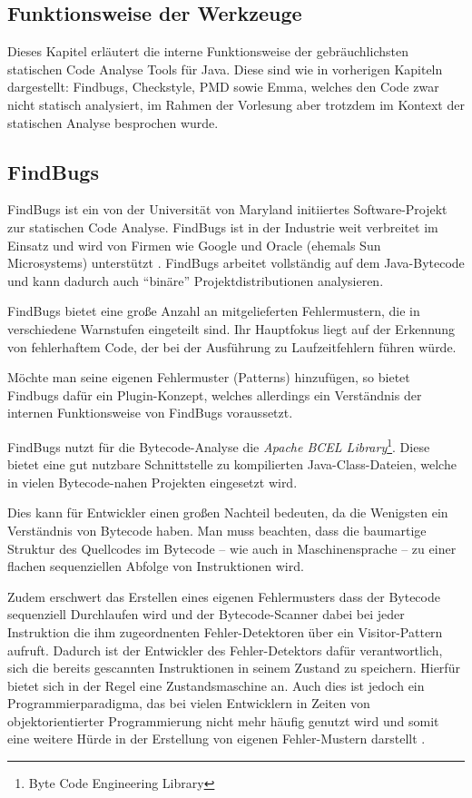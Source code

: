 \begin{flushleft}
\section{Funktionsweise der Werkzeuge}
\end{flushleft}
Dieses Kapitel erläutert die interne Funktionsweise der gebräuchlichsten statischen Code Analyse Tools für Java. Diese sind wie in vorherigen Kapiteln dargestellt: Findbugs, Checkstyle, PMD sowie Emma, welches den Code zwar nicht statisch analysiert, im Rahmen der Vorlesung aber trotzdem im Kontext der statischen Analyse besprochen wurde.


\subsection{FindBugs}

FindBugs ist ein von der Universität von Maryland initiiertes Software-Projekt zur statischen Code Analyse. FindBugs ist in der Industrie weit verbreitet im Einsatz und wird von Firmen wie Google und Oracle (ehemals Sun Microsystems) unterstützt \citep{findbugsUser}.
FindBugs arbeitet vollständig auf dem Java-Bytecode und kann dadurch auch ``binäre'' Projektdistributionen analysieren. 

FindBugs bietet eine große Anzahl an mitgelieferten Fehlermustern, die in verschiedene Warnstufen eingeteilt sind. Ihr Hauptfokus liegt auf der Erkennung von fehlerhaftem Code, der bei der Ausführung zu Laufzeitfehlern führen würde.

Möchte man seine eigenen Fehlermuster (Patterns) hinzufügen, so bietet Findbugs dafür ein Plugin-Konzept, welches allerdings ein Verständnis der internen Funktionsweise von FindBugs voraussetzt.
 
FindBugs nutzt für die Bytecode-Analyse die \textit{Apache BCEL Library}\footnote{Byte Code Engineering Library}. Diese bietet eine gut nutzbare Schnittstelle zu kompilierten Java-Class-Dateien, welche in vielen Bytecode-nahen Projekten eingesetzt wird. %

Dies kann für Entwickler einen großen Nachteil bedeuten, da die Wenigsten ein Verständnis von Bytecode haben. Man muss beachten, dass die baumartige Struktur des Quellcodes im Bytecode -- wie auch in Maschinensprache -- zu einer flachen sequenziellen Abfolge von Instruktionen wird. 

Zudem erschwert das Erstellen eines eigenen Fehlermusters dass der Bytecode sequenziell Durchlaufen wird und der Bytecode-Scanner dabei bei jeder Instruktion die ihm zugeordnenten Fehler-Detektoren über ein Visitor-Pattern aufruft. 
Dadurch ist der Entwickler des Fehler-Detektors dafür verantwortlich, sich die bereits gescannten Instruktionen in seinem Zustand zu speichern. Hierfür bietet sich in der Regel eine Zustandsmaschine an. Auch dies ist jedoch ein Programmierparadigma, das bei vielen Entwicklern in Zeiten von objektorientierter Programmierung nicht mehr häufig genutzt wird und somit eine weitere Hürde in der Erstellung von eigenen Fehler-Mustern darstellt \citep{findbugsDetector}.

